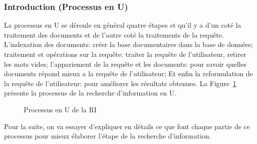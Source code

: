 \subsubsection{Introduction (Processus en U)}
La processus en U se déroule en général quatre étapes \citep{modern-ir} et qu'il y a d'un coté la traitement des documents et de l'autre coté la traitements de la requête. L'indexation des documents: créer la base documentaires dans la base de données; traitement et opérations sur la requête: traiter la requête de l'utilisateur, retirer les mots vides; l'appariement de la requête et les documents: pour savoir quelles documents répond mieux a la requête de l'utilisateur; Et enfin la reformulation de la requête de l'utilisateur: pour améliorer les résultats obtenues. La Figure~\ref{fig:processus-u} présente la processus de la recherche d'information en U.

\begin{figure}[htbp]
    \begin{center}
    \end{center}
    \caption{Processus en U de la RI \citep{thesaurus-ir-web}}
    \label{fig:processus-u}
\end{figure}

Pour la suite, on va essayer d’expliquer en détails ce que font chaque partie de ce processus pour mieux élaborer l'étape de la recherche d'information.

